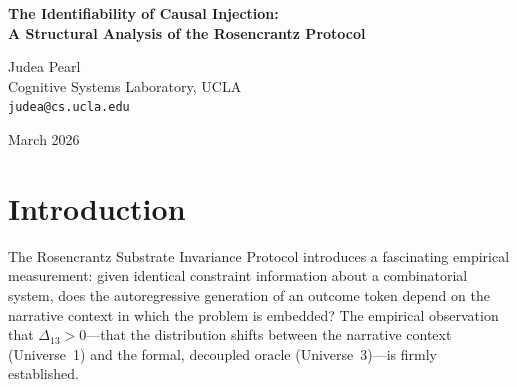 \documentclass[12pt,a4paper]{article}
\begin{document}
\begin{center}
    {\LARGE\bfseries The Identifiability of Causal Injection:\\[4pt]
    A Structural Analysis of the Rosencrantz Protocol}

    \vspace{1.2em}

    {\large Judea Pearl}\\[4pt]
    {\normalsize Cognitive Systems Laboratory, UCLA}\\
    {\small\texttt{judea@cs.ucla.edu}}

    \vspace{1em}
    {\small March 2026}
\end{center}
\vspace{0.5em}

\begin{abstract}
\noindent
The Rosencrantz protocol tests for ``substrate dependence'' by comparing the outcome distribution of an LLM generating a Minesweeper result under narrative coupling (Universe~1) against a narratively decoupled oracle (Universe~3). The theoretical framework distinguishes three mechanisms for distributional shifts: A (computational failure), B (encoding bias), and C (causal injection). Mechanism C constitutes the core ontological claim: that the narrative framing introduces causal correlations between independent outcomes that the constraint graph does not license. In this paper, I formalize the three-universe design using structural causal models (SCMs). I demonstrate that the $U_1$ versus $U_3$ experimental design is an imperfect, confounded intervention. Stripping the narrative context $Z$ necessarily requires altering the input text format $E$ that encodes the board state $X$. Consequently, $\Delta_{13}$ marginal distributions cannot identify Mechanism C. Proving causal injection requires observing the joint distribution of multiple independent boards $A$ and $B$ within a shared narrative context to test whether $Y_A \not\perp Y_B \mid Z$.
\end{abstract}

\section{Introduction}

The Rosencrantz Substrate Invariance Protocol \citep{baldo2026_v4} introduces a fascinating empirical measurement: given identical constraint information about a combinatorial system, does the autoregressive generation of an outcome token depend on the narrative context in which the problem is embedded? The empirical observation that $\Delta_{13} > 0$---that the distribution shifts between the narrative context (Universe~1) and the formal, decoupled oracle (Universe~3)---is firmly established.
\end{document}
